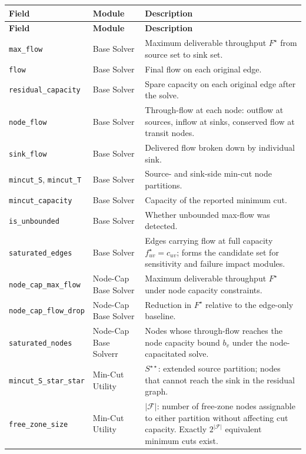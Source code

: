 \documentclass[12pt]{report}
\begin{document}
\begin{longtable}{>{\raggedright\arraybackslash}p{4cm} >{\raggedright\arraybackslash}p{2.5cm} p{7.5cm}}
\toprule
\textbf{Field} & \textbf{Module} & \textbf{Description} \\
\midrule
\endfirsthead
\toprule
\textbf{Field} & \textbf{Module} & \textbf{Description} \\
\midrule
\endhead
\bottomrule
\endfoot
\texttt{max\_flow} & Base Solver & Maximum deliverable throughput $F^\star$ from source set to sink set. \\[2pt]
\texttt{flow} & Base Solver & Final flow on each original edge. \\[2pt]
\texttt{residual\_capacity} & Base Solver & Spare capacity on each original edge after the solve. \\[2pt]
\texttt{node\_flow} & Base Solver & Through-flow at each node: outflow at sources, inflow at sinks, conserved flow at transit nodes. \\[2pt]
\texttt{sink\_flow} & Base Solver & Delivered flow broken down by individual sink. \\[2pt]
\texttt{mincut\_S}, \texttt{mincut\_T} & Base Solver & Source- and sink-side min-cut node partitions. \\[2pt]
\texttt{mincut\_capacity} & Base Solver & Capacity of the reported minimum cut. \\[2pt]
\texttt{is\_unbounded} & Base Solver & Whether unbounded max-flow was detected. \\[2pt]
\texttt{saturated\_edges} & Base Solver & Edges carrying flow at full capacity $f^\star_{uv} = c_{uv}$; forms the candidate set for sensitivity and failure impact modules. \\[2pt]
\midrule
\texttt{node\_cap\_max\_flow} & Node-Cap Base Solver & Maximum deliverable 
throughput $F^\star$ under node capacity constraints. \\[2pt]
\texttt{node\_cap\_flow\_drop} & Node-Cap Base Solver & Reduction in 
$F^\star$ relative to the edge-only baseline. \\[2pt]
\texttt{saturated\_nodes} & Node-Cap Base Solverr & Nodes whose through-flow 
reaches the node capacity bound $b_v$ under the node-capacitated solve. \\[2pt]
\midrule
\texttt{mincut\_S\_star\_star} & Min-Cut Utility & $S^{\star\star}$: extended source partition; nodes that cannot reach the sink in the residual graph. \\[2pt]
\texttt{free\_zone\_size} & Min-Cut Utility & $|\mathcal{F}|$: number of free-zone nodes assignable to either partition without affecting cut capacity. Exactly $2^{|\mathcal{F}|}$ equivalent minimum cuts exist. \\[2pt]

\end{longtable}
\end{document}
